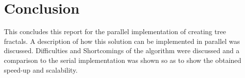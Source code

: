 \documentclass[11pt]{article}
\begin{document}



\section{Conclusion}
This concludes this report for the parallel implementation of creating tree fractals. A description of how this solution can be implemented in parallel was discussed. Difficulties and Shortcomings of the algorithm were discussed and a comparison to the serial implementation was shown so as to show the obtained speed-up and scalability.




\pagebreak

%
\end{document}

